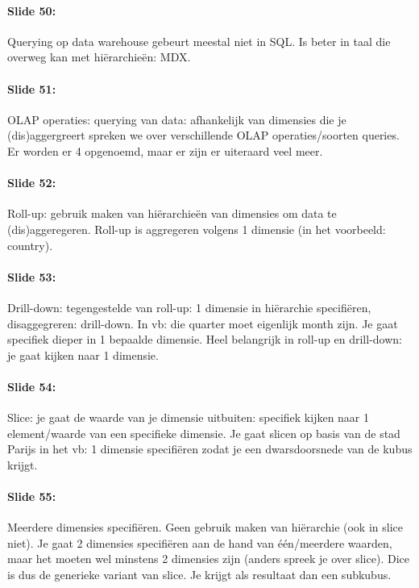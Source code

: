 \documentclass[10pt,a4paper]{report}
\begin{document}
\paragraph{Slide 50:}Querying op data warehouse gebeurt meestal niet in SQL. Is beter in taal die overweg kan met hi\"erarchieën: MDX.

\paragraph{Slide 51:}OLAP operaties: querying van data: afhankelijk van dimensies die je (dis)aggergreert spreken we over verschillende OLAP operaties/soorten queries. Er worden er 4 opgenoemd, maar er zijn er uiteraard veel meer.

\paragraph{Slide 52:}Roll-up: gebruik maken van hi\"erarchie\"en van dimensies om data te (dis)aggeregeren. Roll-up is aggregeren volgens 1 dimensie (in het voorbeeld: country).

\paragraph{Slide 53:}Drill-down: tegengestelde van roll-up: 1 dimensie in hi\"erarchie specifi\"eren, disaggegreren: drill-down. In vb: die quarter moet eigenlijk month zijn. Je gaat specifiek dieper in 1 bepaalde dimensie. Heel belangrijk in roll-up en drill-down: je gaat kijken naar 1 dimensie.

\paragraph{Slide 54:}Slice: je gaat de waarde van je dimensie uitbuiten: specifiek kijken naar 1 element/waarde van een specifieke dimensie. Je gaat slicen op basis van de stad Parijs in het vb: 1 dimensie specifi\"eren zodat je een dwarsdoorsnede van de kubus krijgt.

\paragraph{Slide 55:}Meerdere dimensies specifi\"eren. Geen gebruik maken van hi\"erarchie (ook in slice niet). Je gaat 2 dimensies specifi\"eren aan de hand van \'e\'en/meerdere waarden, maar het moeten wel minstens 2 dimensies zijn (anders spreek je over slice). Dice is dus de generieke variant van slice. Je krijgt als resultaat dan een subkubus.
\end{document}
